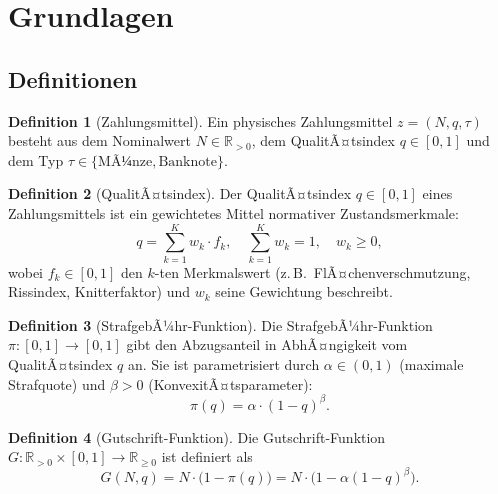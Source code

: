 ﻿\documentclass[a4paper,12pt]{article}
\theoremstyle{definition}
\newtheorem{definition}{Definition}
\begin{document}
\section{Grundlagen}
\label{sec:grundlagen}

\subsection{Definitionen}

\begin{definition}[Zahlungsmittel]
Ein physisches Zahlungsmittel $z = (N, q, \tau)$ besteht aus dem Nominalwert
$N \in \mathbb{R}_{>0}$, dem QualitÃ¤tsindex $q \in [0,1]$ und dem Typ
$\tau \in \{\text{MÃ¼nze}, \text{Banknote}\}$.
\end{definition}

\begin{definition}[QualitÃ¤tsindex]
\label{def:qualitaet}
Der QualitÃ¤tsindex $q \in [0,1]$ eines Zahlungsmittels ist ein gewichtetes Mittel
normativer Zustandsmerkmale:
\[
q = \sum_{k=1}^{K} w_k \cdot f_k,
\quad
\sum_{k=1}^{K} w_k = 1,\quad w_k \geq 0,
\]
wobei $f_k \in [0,1]$ den $k$-ten Merkmalswert (z.\,B.\ FlÃ¤chenverschmutzung,
Rissindex, Knitterfaktor) und $w_k$ seine Gewichtung beschreibt.
\end{definition}

\begin{definition}[StrafgebÃ¼hr-Funktion]
\label{def:strafe}
Die StrafgebÃ¼hr-Funktion $\pi : [0,1] \to [0,1]$ gibt den Abzugsanteil in
AbhÃ¤ngigkeit vom QualitÃ¤tsindex $q$ an.  Sie ist parametrisiert durch
$\alpha \in (0,1)$ (maximale Strafquote) und $\beta > 0$ (KonvexitÃ¤tsparameter):
\[
\pi(q) = \alpha \cdot (1 - q)^{\beta}.
\]
\end{definition}

\begin{definition}[Gutschrift-Funktion]
\label{def:gutschrift}
Die Gutschrift-Funktion $G : \mathbb{R}_{>0} \times [0,1] \to \mathbb{R}_{\geq 0}$ ist definiert als
\[
G(N, q) = N \cdot \bigl(1 - \pi(q)\bigr) = N \cdot \bigl(1 - \alpha(1-q)^{\beta}\bigr).
\]
\end{definition}
\end{document}
